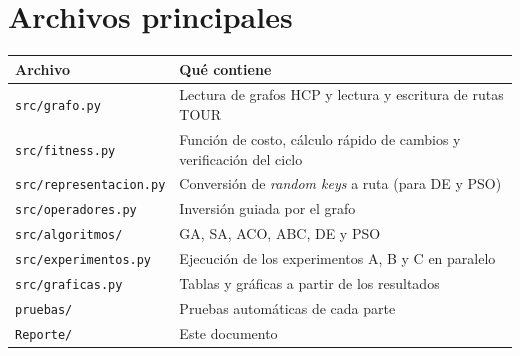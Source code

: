 \section{Archivos principales}
\begin{table}[H]
\centering\small\filas
\begin{tabularx}{\textwidth}{lL}
\toprule
Archivo & Qué contiene \\
\midrule
\texttt{src/grafo.py} & Lectura de grafos HCP y lectura y escritura de rutas TOUR \\
\texttt{src/fitness.py} & Función de costo, cálculo rápido de cambios y verificación del ciclo \\
\texttt{src/representacion.py} & Conversión de \emph{random keys} a ruta (para DE y PSO) \\
\texttt{src/operadores.py} & Inversión guiada por el grafo \\
\texttt{src/algoritmos/} & GA, SA, ACO, ABC, DE y PSO \\
\texttt{src/experimentos.py} & Ejecución de los experimentos A, B y C en paralelo \\
\texttt{src/graficas.py} & Tablas y gráficas a partir de los resultados \\
\texttt{pruebas/} & Pruebas automáticas de cada parte \\
\texttt{Reporte/} & Este documento \\
\bottomrule
\end{tabularx}
\end{table}
